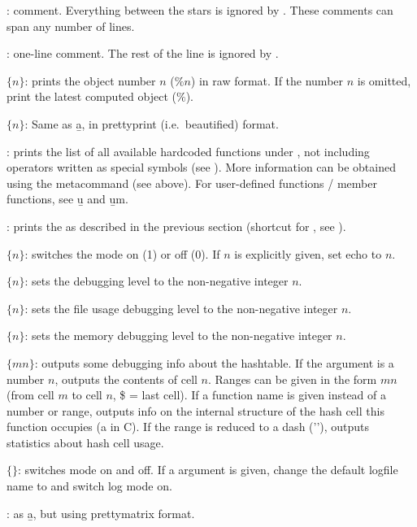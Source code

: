 : comment. Everything between the stars is ignored by
. These comments can span any number of lines.

\subseckbd{\bs\bs}: one-line comment. The rest of the line
is ignored by .

 $\{n\}$: prints the object number $n$ ($\%n$)
in raw format. If the number $n$ is omitted, print the latest computed object
($\%$). \label{se:history}

 $\{n\}$: Same as \b{a}, in prettyprint (i.e.~beautified)
format.

: prints the list of all available
hardcoded functions under , not including operators written as special
symbols (see ). More information can be obtained using
the  metacommand (see above). For user-defined functions / member
functions, see \b{u} and \b{um}.

: prints the  as described in the
previous section (shortcut for , see ).

 $\{n\}$: switches the  mode on (1) or off (0). If
$n$ is explicitly given, set echo to $n$.

 $\{n\}$: sets the debugging level  to the
non-negative integer $n$.

 $\{n\}$: sets the file usage debugging level 
to the non-negative integer $n$.

 $\{n\}$: sets the memory debugging level 
to the non-negative integer $n$.

 $\{m$\kbd{-}$n\}$: outputs some debugging info about the
hashtable. If the argument is a number $n$, outputs the contents of cell
$n$. Ranges can be given in the form $m$\kbd{-}$n$ (from cell $m$ to cell
$n$, \$ = last cell). If a function name is given instead of a number or
range, outputs info on the internal structure of the hash cell this
function occupies (a  in C). If the range is reduced to
a dash ('\kbd{-}'), outputs statistics about hash cell usage.

 $\{$$\}$: switches  mode on and off.
If a  argument is given, change the default logfile name to
 and switch log mode on.

: as \b{a}, but using prettymatrix format.

